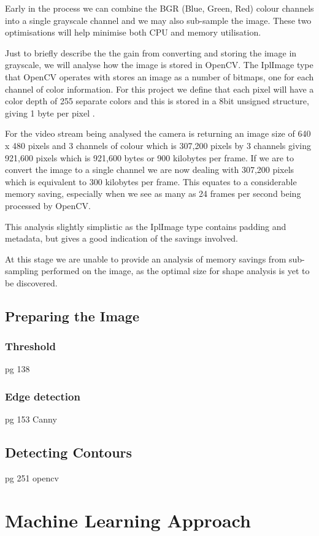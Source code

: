Early in the process we can combine the BGR (Blue, Green, Red) colour channels into a single grayscale channel and we may also sub-sample the image. These two optimisations will help minimise both CPU and memory utilisation.

Just to briefly describe the the gain from converting and storing the image in grayscale, we will analyse how the image is stored in OpenCV. The IplImage type that OpenCV operates with stores an image as a number of bitmaps, one for each channel of color information. For this project we define that each pixel will have a color depth of 255 separate colors and this is stored in a 8bit unsigned structure, giving 1 byte per pixel \cite{morganIPL06}.

For the video stream being analysed the camera is returning an image size of 640 x 480 pixels and 3 channels of colour which is 307,200 pixels by 3 channels giving 921,600 pixels which is 921,600 bytes or 900 kilobytes per frame.  If we are to convert the image to a single channel we are now dealing with 307,200 pixels which is equivalent to 300 kilobytes per frame. This equates to a considerable memory saving, especially when we see as many as 24 frames per second being processed by OpenCV.

This analysis slightly simplistic as the IplImage type contains padding and metadata, but gives a good indication of the savings involved.

At this stage we are unable to provide an analysis of memory savings from sub-sampling performed on the image, as the optimal size for shape analysis is yet to be discovered.


\subsection{Preparing the Image}

\subsubsection{Threshold}
pg 138

\subsubsection{Edge detection}
pg 153
Canny 

\subsection{Detecting Contours}
pg 251 opencv

\section{Machine Learning Approach}
